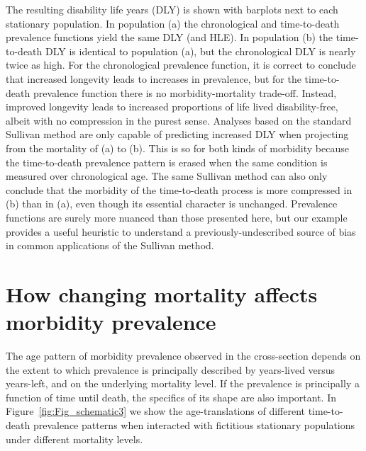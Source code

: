 \documentclass[11pt,oneside,a4paper]{article} %
\begin{document}
The resulting disability life years (DLY) is shown with
barplots next to each stationary population.
In population (a) the chronological and time-to-death prevalence functions yield
the same DLY (and HLE). In population (b) the time-to-death DLY is identical to
population (a), but the chronological DLY is nearly twice as high. For the
chronological prevalence function, it is correct to conclude that increased longevity leads to
increases in prevalence, but for the time-to-death prevalence function there is
no morbidity-mortality trade-off. Instead, improved longevity leads to increased proportions of life
lived disability-free, albeit with no compression in the purest sense. Analyses
based on the standard Sullivan method \citep{Sullivan1970} are only capable of
predicting increased DLY when projecting from the mortality of (a) to (b). This
is so for both kinds of morbidity because the time-to-death prevalence pattern
is erased when the same condition is measured over chronological age. The same
Sullivan method can also only conclude that the morbidity of the time-to-death
process is more compressed in (b) than in (a), even though its essential
character is unchanged. Prevalence functions are surely more nuanced than those
presented here, but our example provides a useful heuristic to understand a previously-undescribed source of bias in common applications of the Sullivan method.

\FloatBarrier
\section{How changing mortality affects morbidity prevalence}

The age pattern of morbidity prevalence observed in the cross-section depends
on the extent to which prevalence is principally described by
years-lived versus years-left, and on the underlying mortality
level. If the prevalence is principally a function of time until death, the
specifics of its shape are also important. In Figure~\ref{fig:Fig_schematic3} we
show the age-translations of different time-to-death prevalence patterns when
interacted with fictitious stationary populations under different mortality levels.
\end{document}
